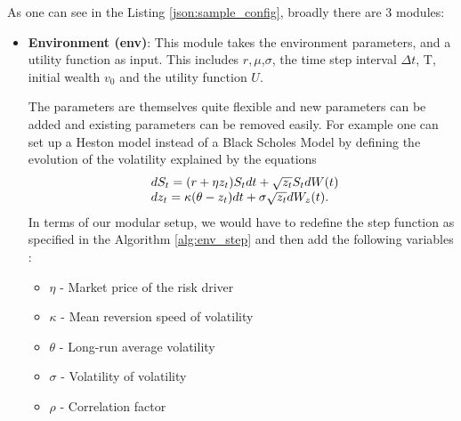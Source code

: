  As one can see in the Listing \ref{json:sample_config}, broadly there are 3 modules: 
 \begin{itemize}
     \item \textbf{Environment (env)}: This module takes the environment parameters, and a utility function as input. This includes $r,\mu$,$\sigma$, the time step interval $\Delta t$, T, initial wealth $v_0$ and the utility function $U$.
     
     The parameters are themselves quite flexible and new parameters can be added and existing parameters can be removed easily. For example one can set up a Heston model \cite{Heston1993}  instead of a Black Scholes Model by defining the evolution of the volatility explained by the equations
     \begin{equation}\label{HestonEq}
    \begin{array}{l@{}l}
     dS_t = (r + \eta z_t)S_tdt + \sqrt{z_t}S_tdW(t)\\
     dz_t = \kappa(\theta - z_t)dt + \sigma \sqrt{z_t}dW_z(t).     
     \end{array}
     \end{equation}
     In terms of our modular setup, we would have to redefine the step function as specified in the Algorithm \ref{alg:env_step} and then add the following variables :
     \begin{itemize}
         \item $\eta$ - Market price of the risk driver
         \item $\kappa$ - Mean reversion speed of volatility
         \item $\theta$ - Long-run average volatility
         \item $\sigma$ -  Volatility of volatility
         \item $\rho$ - Correlation factor
         

\end{itemize}
\end{itemize}
